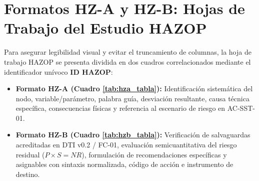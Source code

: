 \documentclass[10pt,letterpaper]{article}
\begin{document}
\newpage

\section{Formatos HZ-A y HZ-B: Hojas de Trabajo del Estudio HAZOP}
Para asegurar legibilidad visual y evitar el truncamiento de columnas, la hoja de trabajo HAZOP se presenta dividida en dos cuadros correlacionados mediante el identificador unívoco \textbf{ID HAZOP}:
\begin{itemize}
    \item \textbf{Formato HZ-A (Cuadro \ref{tab:hza_tabla}):} Identificación sistemática del nodo, variable/parámetro, palabra guía, desviación resultante, causa técnica específica, consecuencias físicas y referencia al escenario de riesgo en AC-SST-01.
    \item \textbf{Formato HZ-B (Cuadro \ref{tab:hzb_tabla}):} Verificación de salvaguardas acreditadas en DTI v0.2 / FC-01, evaluación semicuantitativa del riesgo residual ($P \times S = NR$), formulación de recomendaciones específicas y asignables con sintaxis normalizada, código de acción e instrumento de destino.
\end{itemize}
\end{document}
